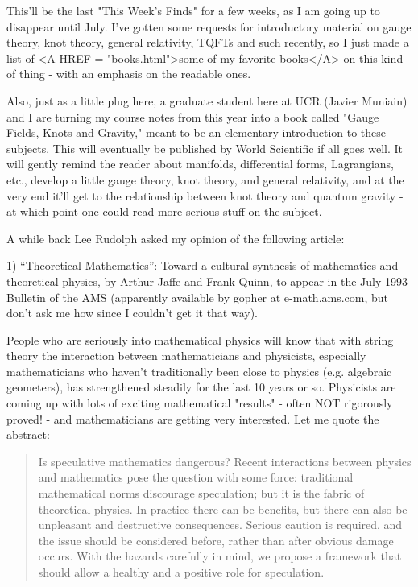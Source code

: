 

This'll be the last "This Week's Finds" for a few weeks, as I am going up to
disappear until July.  I've gotten some requests for introductory
material on gauge theory, knot theory, general relativity, TQFTs and
such recently, so I just made a list
of <A HREF = "books.html">some of my favorite books</A> on this kind of 
thing - with an emphasis on the readable ones.  

Also, just as a little plug here, a graduate student here at UCR (Javier
Muniain) and I are turning my course notes from this year into a book
called "Gauge Fields, Knots and Gravity," meant to be an elementary
introduction to these subjects.  This will eventually be published by
World Scientific if all goes well.  It will gently remind the reader
about manifolds, differential forms, Lagrangians, etc., develop a little
gauge theory, knot theory, and general relativity, and at the very end
it'll get to the relationship between knot theory and quantum gravity -
at which point one could read more serious stuff on the subject.   

A while back Lee Rudolph asked my opinion of the following article:

1) ``Theoretical Mathematics'': Toward a cultural synthesis of
mathematics and theoretical physics, by Arthur Jaffe and Frank Quinn, to
appear in the July 1993 Bulletin of the AMS (apparently available by
gopher at e-math.ams.com, but don't ask me how since I couldn't get it
that way).

People who are seriously into mathematical physics will know that with
string theory the interaction between mathematicians and physicists,
especially mathematicians who haven't traditionally been close to
physics (e.g. algebraic geometers), has strengthened steadily for the
last 10 years or so.  Physicists are coming up with lots of exciting
mathematical "results" - often NOT rigorously proved! - and
mathematicians are getting very interested.  Let me quote the abstract:

\begin{quote}
Is speculative mathematics dangerous?  Recent interactions between
physics and mathematics pose the question with some force:  traditional
mathematical norms discourage speculation; but it is the fabric of
theoretical physics.  In practice there can be benefits, but there can also
be unpleasant and destructive consequences.  Serious caution is required,
and the issue should be considered before, rather than after obvious
damage occurs.  With the hazards carefully in mind, we propose a
framework that should allow a healthy and a positive role for speculation.
\end{quote}

